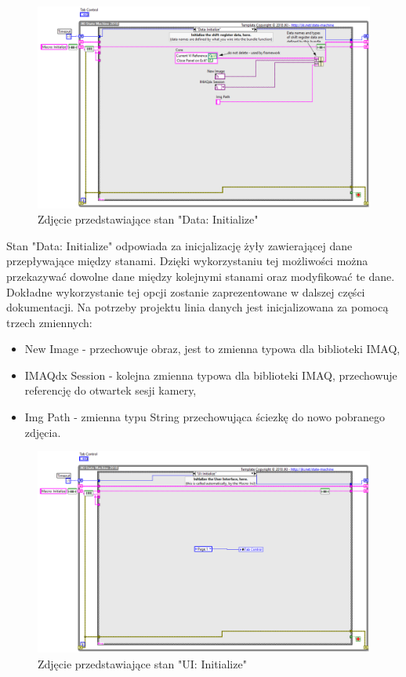 \documentclass{report}
\begin{document}
\begin{figure} [H]
    \centering
    \includegraphics[width=1.0\textwidth]{"src/data-init.png"}
    \caption{Zdjęcie przedstawiające stan "Data: Initialize"}
    \label{fig:foto3}
\end{figure}

Stan "Data: Initialize" odpowiada za inicjalizację żyły zawierającej dane przepływające między stanami. Dzięki wykorzystaniu tej możliwości można przekazywać dowolne dane między kolejnymi stanami oraz modyfikować te dane. 
Dokładne wykorzystanie tej opcji zostanie zaprezentowane w dalszej części dokumentacji. 
Na potrzeby projektu linia danych jest inicjalizowana za pomocą trzech zmiennych:

\begin{itemize}
    \item New Image - przechowuje obraz, jest to zmienna typowa dla biblioteki IMAQ,
    \item IMAQdx Session - kolejna zmienna typowa dla biblioteki IMAQ, przechowuje referencję do otwartek sesji kamery,
    \item Img Path - zmienna typu String przechowująca ściezkę do nowo pobranego zdjęcia.
\end{itemize}

\begin{figure} [H]
    \centering
    \includegraphics[width=1.0\textwidth]{"src/UI-init.png"}
    \caption{Zdjęcie przedstawiające stan "UI: Initialize"}
    \label{fig:foto4}
\end{figure}
\end{document}

